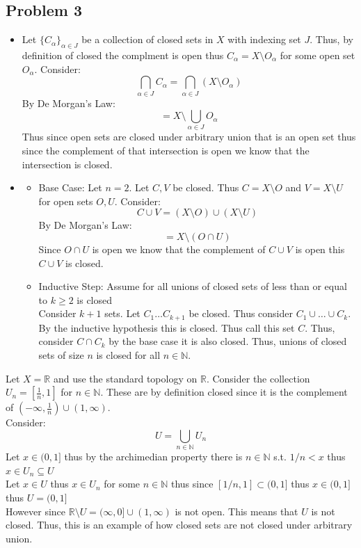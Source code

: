 \documentclass[12pt, letterpaper]{article}
\theoremstyle{definition}
\newcommand{\R}{\mathbb{R}}
\newcommand{\N}{\mathbb{N}}
\begin{document}
\subsection*{Problem 3}
\begin{itemize}
    \item Let $\{C_\alpha\}_{\alpha \in J}$ be a collection of closed sets in $X$ with indexing set $J$. Thus, by definition of closed the complment is open thus $C_\alpha=X \setminus O_\alpha$ for some open set $O_\alpha$. Consider:
    \[\bigcap_{\alpha \in J}C_\alpha=\bigcap_{\alpha \in J}(X \setminus O_\alpha)\]
    By De Morgan's Law:
    \[=X \setminus \bigcup_{\alpha \in J}O_\alpha\]
    Thus since open sets are closed under arbitrary union that is an open set thus since the complement of that intersection is open we know that the intersection is closed.
    \item \begin{itemize}
        \item Base Case: Let $n=2$. Let $C,V$ be closed. Thus $C=X\setminus O$ and $V=X \setminus U$ for open sets $O,U$. Consider: 
        \[C \cup V=(X \setminus O) \cup (X \setminus U)\]
        By De Morgan's Law:
        \[=X \setminus (O \cap U)\]
        Since $O \cap U$ is open we know that the complement of $C \cup V$ is open this $C \cup V$ is closed.
        \item Inductive Step: Assume for all unions of closed sets of less than or equal to $k\geq2$ is closed\\
        Consider $k+1$ sets. Let $C_1\dots C_{k+1}$ be closed. Thus consider $C_1 \cup \dots \cup C_k$. By the inductive hypothesis this is closed. Thus call this set $C$. Thus, consider $C \cap C_{k}$ by the base case it is also closed. Thus, unions of closed sets of size $n$ is closed for all $n \in \N$.
    \end{itemize}
\end{itemize}
Let $X=\R$ and use the standard topology on $\R$. Consider the collection $U_n = [\frac{1}{n},1]$ for $n \in \N$. These are by definition closed since it is the complement of $(-\infty,\frac{1}{n}) \cup (1,\infty)$.\\
Consider:
\[U=\bigcup_{n \in \N}U_n\]
Let $x \in (0,1]$ thus by the archimedian property there is $n \in \N$ s.t. $1/n < x$ thus $x \in U_n \subseteq U$\\
Let $x \in U$ thus $x \in U_n$ for some $n \in \N$ thus since $[1/n,1] \subset (0,1]$ thus $x \in (0,1]$ thus $U=(0,1]$\\
However since $\R \setminus U=(\infty,0] \cup (1,\infty)$ is not open. This means that $U$ is not closed. Thus, this is an example of how closed sets are not closed under arbitrary union.
\end{document}
